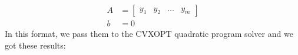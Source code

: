 \documentclass[11pt]{article}
\begin{document}
\begin{equation}
  \begin{split}
    A &=
    \begin{bmatrix}
      y_1 & y_2 & \ldots & y_m
    \end{bmatrix}\\
    b &= 0
  \end{split}
\end{equation}
In this format, we pass them to the CVXOPT quadratic program solver and we got these results:
  
\end{document}
